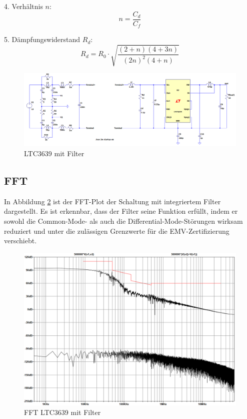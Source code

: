 4. Verhältnis \(n\):
\begin{equation}
    n = \frac{C_d}{C_f}
    \label{eqn:EffektiveKonvergenzordnung}
\end{equation} 

5. Dämpfungswiderstand \(R_d\):
\begin{equation}
    R_d = R_0 \cdot \sqrt{\frac{(2 + n)(4 + 3n)}{(2n)^2(4 + n)}}
    \label{eqn:EffektiveKonvergenzordnung}
\end{equation} 


\begin{figure}[H]
    \centering
    \includegraphics[width=0.8\linewidth]{Figure/LTC3639MitFilter.png}
    \caption{LTC3639 mit Filter}
    \label{fig:LTC3639MitFilter}
\end{figure}


\subsection{FFT}

In Abbildung \ref{fig:LTC3639MitFilterFFT} ist der FFT-Plot der Schaltung mit integriertem Filter dargestellt. Es ist erkennbar, dass der Filter seine Funktion erfüllt, indem er sowohl die Common-Mode- als auch die Differential-Mode-Störungen wirksam reduziert und unter die zulässigen Grenzwerte für die EMV-Zertifizierung verschiebt.


\begin{figure}[H]
    \centering
    \includegraphics[width=0.8\linewidth]{Figure/LTC3639MitFilterFFT.png}
    \caption{FFT LTC3639 mit Filter}
    \label{fig:LTC3639MitFilterFFT}
\end{figure}